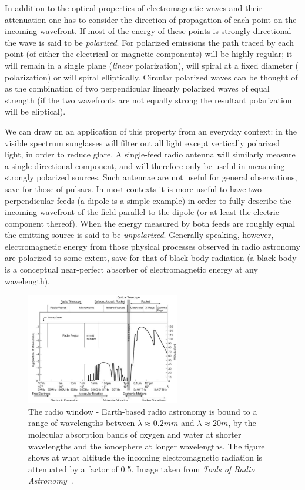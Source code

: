 In addition to the optical properties of electromagnetic waves and their attenuation one has to consider the direction of propagation of each point on the incoming wavefront. If most of the energy of these points is strongly 
directional the wave is said to be \textit{polarized}. For polarized emissions the path traced by each point (of either the electrical or magnetic components) will be highly regular; it will 
remain in a single plane (\textit{linear} polarization), will spiral at a fixed diameter ( polarization) or will spiral elliptically. Circular polarized waves can be thought 
of as the combination of two perpendicular linearly polarized waves of equal strength (if the two wavefronts are not equally strong the resultant polarization will be eliptical). 

We can draw on an application of this property from an everyday context: in the visible spectrum sunglasses will filter out all light except vertically polarized light, in order to reduce glare. A single-feed radio 
antenna will similarly measure a single directional component, and will therefore only be useful in measuring strongly polarized sources. Such antennae are not useful for general observations, save for 
those of pulsars. In most contexts it is more useful to have two perpendicular feeds (a dipole is a simple example) in order to fully describe the incoming wavefront of the field parallel to the dipole (or at least 
the electric component thereof). When the energy measured by both feeds are roughly equal the emitting source is said to be \textit{unpolarized}. Generally speaking, however, electromagnetic energy from those 
physical processes observed in radio astronomy are polarized to some extent, save for that of black-body radiation (a black-body is a conceptual near-perfect absorber of electromagnetic energy at any wavelength).
\begin{figure}[ht]
 \begin{mdframed}
 \centering
 \includegraphics[width=0.6\textwidth]{images/radio_window.png}
 \caption[The radio window]{The radio window - Earth-based radio astronomy is bound to a range of wavelengths between $\lambda\approx 0.2mm$ and $\lambda\approx 20m$, by the molecular absorption bands of oxygen and water at
 shorter wavelengths and the ionosphere at longer wavelengths. The figure shows at what altitude the incoming electromagnetic radiation is attenuated by a factor of 0.5. Image taken from \textit{Tools of Radio Astronomy}~\cite{wilson2009tools}.}
 \label{fig_radio_window}
 \end{mdframed}
\end{figure}

